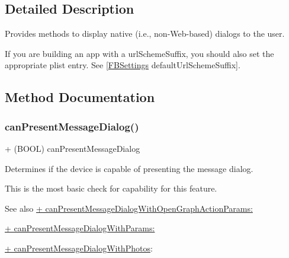 \subsection{Detailed Description}
Provides methods to display native (i.\+e., non-\/\+Web-\/based) dialogs to the user.

If you are building an app with a url\+Scheme\+Suffix, you should also set the appropriate plist entry. See {\ttfamily \mbox{[}\hyperlink{interfaceFBSettings}{F\+B\+Settings} default\+Url\+Scheme\+Suffix\mbox{]}}. 

\subsection{Method Documentation}
\mbox{\label{interfaceFBDialogs_aa41db27dd00b0c59e01d45f72b9045aa}} 
\subsubsection{\texorpdfstring{can\+Present\+Message\+Dialog()}{canPresentMessageDialog()}\hspace{0.1cm}{\footnotesize\ttfamily [1/5]}}
{\footnotesize\ttfamily + (B\+O\+OL) can\+Present\+Message\+Dialog \begin{DoxyParamCaption}{ }\end{DoxyParamCaption}}

Determines if the device is capable of presenting the message dialog.

This is the most basic check for capability for this feature.

\begin{DoxySeeAlso}{See also}
\hyperlink{interfaceFBDialogs_abc596dd117701ceb160dd63db514cf11}{+ can\+Present\+Message\+Dialog\+With\+Open\+Graph\+Action\+Params\+:} 

\hyperlink{interfaceFBDialogs_a81544299ca98179464ec34fc0e8d12b7}{+ can\+Present\+Message\+Dialog\+With\+Params\+:} 

\hyperlink{interfaceFBDialogs_ac10e310c30d763c7885c11fb44ac4924}{+ can\+Present\+Message\+Dialog\+With\+Photos}\+: 
\end{DoxySeeAlso}
\mbox{\label{interfaceFBDialogs_aa41db27dd00b0c59e01d45f72b9045aa}} 
